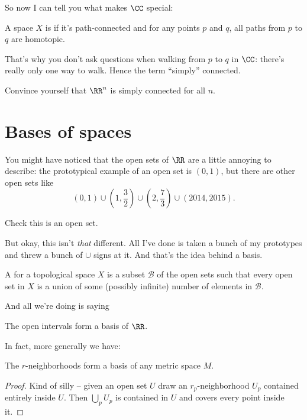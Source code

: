 So now I can tell you what makes $\CC$ special:
\begin{definition}
	A space $X$ is  if it's path-connected and
	for any points $p$ and $q$, all paths from $p$ to $q$ are homotopic.
\end{definition}
That's why you don't ask questions when walking from $p$ to $q$ in $\CC$:
there's really only one way to walk. Hence the term ``simply'' connected.

\begin{ques}
	Convince yourself that $\RR^n$ is simply connected for all $n$.
\end{ques}

\section{Bases of spaces}

You might have noticed that the open sets of $\RR$ are a little annoying to describe:
the prototypical example of an open set is $(0,1)$,
but there are other open sets like
\[
	(0,1)
	\cup \left( 1, \frac32 \right)
	\cup \left( 2, \frac 73 \right)
	\cup (2014, 2015). \]
\begin{ques}
	Check this is an open set.
\end{ques}

But okay, this isn't \emph{that} different.
All I've done is taken a bunch of my prototypes and threw a bunch of $\cup$ signs at it.
And that's the idea behind a basis.

\begin{definition}
	A  for a topological space $X$
	is a subset $\mathcal B$ of the open sets
	such that every open set in $X$
	is a union of some (possibly infinite) number of elements in
	$\mathcal B$.
\end{definition}

And all we're doing is saying
\begin{example}[Basis of $\RR$]
	The open intervals form a basis of $\RR$.
\end{example}
In fact, more generally we have:
\begin{theorem}
	The $r$-neighborhoods form a basis of any metric space $M$.
\end{theorem}
\begin{proof}
	Kind of silly -- given an open set $U$
	draw an $r_p$-neighborhood $U_p$ contained entirely inside $U$.
	Then $\bigcup_p U_p$ is contained in $U$ and covers
	every point inside it.
\end{proof}

